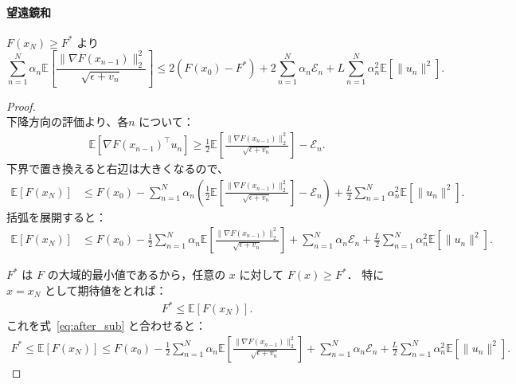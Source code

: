\documentclass[dvipdfmx,a4paper,11pt]{jsarticle}
\begin{document}
\paragraph{望遠鏡和}
$F(x_N)\geq F^*$ より
\begin{equation}
    \sum_{n=1}^N \alpha_n
    \mathbb{E}\!\left[
        \frac{\|\nabla F(x_{n-1})\|_2^2}{\sqrt{\epsilon + v_n}}
    \right]
    \leq
    2(F(x_0)-F^*) + 2\sum_{n=1}^N \alpha_n \mathcal{E}_n
    + L\sum_{n=1}^N \alpha_n^2 \mathbb{E}[\|u_n\|^2].
\end{equation}
\begin{proof}\ \\
\noindent
下降方向の評価より、各$n$ について：
\begin{align}
    \mathbb{E}[\nabla F(x_{n-1})^\top u_n]
    \geq \frac{1}{2}\mathbb{E}\!\left[
        \frac{\|\nabla F(x_{n-1})\|_2^2}{\sqrt{\epsilon + v_n}}
    \right] - \mathcal{E}_n.
\end{align}
下界で置き換えると右辺は大きくなるので、
\begin{align}
    \mathbb{E}[F(x_N)]
    &\leq F(x_0)
    - \sum_{n=1}^N \alpha_n
      \left(
        \frac{1}{2}\mathbb{E}\!\left[
          \frac{\|\nabla F(x_{n-1})\|_2^2}{\sqrt{\epsilon+v_n}}
        \right]
        - \mathcal{E}_n
      \right)
    + \frac{L}{2}\sum_{n=1}^N \alpha_n^2 \mathbb{E}[\|u_n\|^2].
\end{align}
括弧を展開すると：
\begin{align}
    \mathbb{E}[F(x_N)]
    &\leq F(x_0)
    - \frac{1}{2}\sum_{n=1}^N \alpha_n
      \mathbb{E}\!\left[
        \frac{\|\nabla F(x_{n-1})\|_2^2}{\sqrt{\epsilon+v_n}}
      \right]
    + \sum_{n=1}^N \alpha_n \mathcal{E}_n
    + \frac{L}{2}\sum_{n=1}^N \alpha_n^2 \mathbb{E}[\|u_n\|^2].
    \label{eq:after_sub}
\end{align}

\medskip
$F^*$ は $F$ の大域的最小値であるから，任意の $x$ に対して $F(x) \geq F^*$．
特に $x = x_N$ として期待値をとれば：
\begin{align}
    F^* \leq \mathbb{E}[F(x_N)].
\end{align}
これを式~\eqref{eq:after_sub} と合わせると：
\begin{align}
    F^*
    \leq \mathbb{E}[F(x_N)]
    \leq F(x_0)
    - \frac{1}{2}\sum_{n=1}^N \alpha_n
      \mathbb{E}\!\left[
        \frac{\|\nabla F(x_{n-1})\|_2^2}{\sqrt{\epsilon+v_n}}
      \right]
    + \sum_{n=1}^N \alpha_n \mathcal{E}_n
    + \frac{L}{2}\sum_{n=1}^N \alpha_n^2 \mathbb{E}[\|u_n\|^2].
\end{align}


\end{proof}
\end{document}
